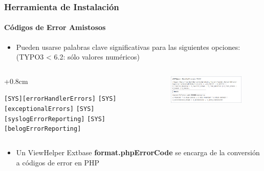 
\begin{frame}[fragile]
	\frametitle{Herramienta de Instalación}
	\framesubtitle{Códigos de Error Amistosos}

	\begin{itemize}
		\item Pueden usarse palabras clave significativas para las siguientes opciones:\newline
			(TYPO3 < 6.2: sólo valores numéricos)
	\end{itemize}

	\begin{columns}[T]
		\begin{column}{.4\textwidth}
			\advance\leftskip+0.8cm

			\smaller
				\texttt{[SYS][errorHandlerErrors]}\newline
				\texttt{[SYS][exceptionalErrors]}\newline
				\texttt{[SYS][syslogErrorReporting]}\newline
				\texttt{[SYS][belogErrorReporting]}\newline
			\normalsize

		\end{column}
		\begin{column}{.6\textwidth}

			\begin{figure}\vspace*{-0.4cm}
				\includegraphics[width=0.9\linewidth]{Images/InstallTool/HumanFriendlyErrorCodes.png}
			\end{figure}

		\end{column}
	\end{columns}

	\vspace{0.2cm}

	\begin{itemize}
		\item Un ViewHelper Extbase \textbf{format.phpErrorCode} se encarga de la conversión a códigos de error en PHP
	\end{itemize}

\end{frame}

